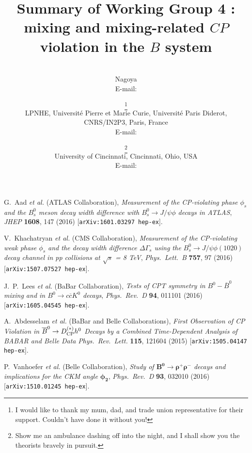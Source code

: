\documentclass{PoS}
\title{Summary of Working Group 4 : mixing and mixing-related $CP$ violation in the $B$ system}
\author{\speaker{Alessandro Gaz}\\
        Nagoya\\
        E-mail: \email{gaz@hepl.phys.nagoya-u.ac.jp}}
\author{
        \speaker{Vladimir V. Gligorov}\thanks{I would like to thank my mum, dad, and trade union representative for their support. Couldn't have done it without you!}\\
        LPNHE, Universit\'{e} Pierre et Marie Curie, Universit\'{e} Paris Diderot, CNRS/IN2P3, Paris, France\\
        E-mail: \email{vgligoro@lpnhe.in2p3.fr}
        }
\author{
        \speaker{Dean Robinson}\thanks{Show me an ambulance dashing off into the night, and I shall show you the theorists bravely in pursuit.}\\
        University of Cincinnati, Cincinnati, Ohio, USA\\
        E-mail: \email{dean.robinson@uc.edu}\\
        }
\begin{document}


%
%
%










%
%


\begin{thebibliography}{99}


  G.~Aad \emph{et al.} (ATLAS Collaboration),
  \emph{Measurement of the CP-violating phase $\phi_s$ and the $B^0_s$ meson decay width
    difference with $B^0_s \to J/\psi \phi$ decays in ATLAS},
  \emph{JHEP} {\bf 1608}, 147 (2016) [{\tt arXiv:1601.03297 hep-ex}].

  V.~Khachatryan \emph{et al.} (CMS Collaboration),
  \emph{Measurement of the CP-violating weak phase $\phi_s$ and the decay width difference
    $\Delta\Gamma_s$ using the $B^0_s \to J/\psi \phi(1020)$ decay channel in pp collisions
    at $\sqrt{s}$ = 8 TeV},
  \emph{Phys.~Lett.~B} {\bf 757}, 97 (2016) [{\tt arXiv:1507.07527 hep-ex}].

  J.~P.~Lees \emph{et al.} (BaBar Collaboration),
  \emph{Tests of CPT symmetry in $B^0-\overline{B}^0$ mixing and in $B^0 \to c\overline{c}K^0$ decays},
  \emph{Phys.~Rev.~D} {\bf 94}, 011101 (2016) [{\tt arXiv:1605.04545 hep-ex}].

  A.~Abdesselam \emph{et al.} (BaBar and Belle Collaborations),
  \emph{First Observation of CP Violation in $\overline{B}^0 \to
      D^{(*)}_{\rm CP} h^0$ Decays by a Combined Time-Dependent Analysis of BABAR and Belle Data}
  \emph{Phys.~Rev.~Lett.} {\bf 115}, 121604 (2015) [{\tt arXiv:1505.04147 hep-ex}].
  
  P.~Vanhoefer  \emph{et al.} (Belle Collaboration),
  \emph{Study of $\mathbf{B^{0}\rightarrow\rho^{+}\rho^{-}}$
    decays and implications for the CKM angle $\mathbf{\phi_2}$},
  \emph{Phys.~Rev.~D} {\bf 93}, 032010 (2016) [{\tt arXiv:1510.01245 hep-ex}].


\end{thebibliography}
\end{document}
